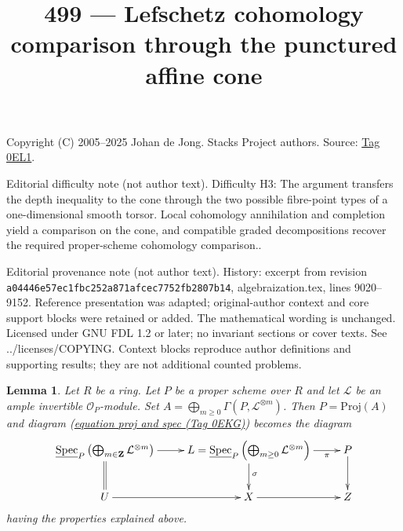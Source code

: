 \documentclass{amsart}
\theoremstyle{plain}
\newtheorem{lemma}[subsection]{Lemma}
\theoremstyle{definition}
\theoremstyle{remark}
\numberwithin{equation}{subsection}
\def\Spec{\mathop{\mathrm{Spec}}}
\begin{document}
\title[Stacks Project, Tag 0EL1]{499 --- Lefschetz cohomology comparison through the punctured affine cone}
\maketitle
\noindent Copyright (C) 2005--2025 Johan de Jong. Stacks Project authors. Source: \href{https://stacks.math.columbia.edu/tag/0EL1}{Tag 0EL1}.

\noindent Editorial difficulty note (not author text). Difficulty H3: The argument transfers the depth inequality to the cone through the two possible fibre-point types of a one-dimensional smooth torsor. Local cohomology annihilation and completion yield a comparison on the cone, and compatible graded decompositions recover the required proper-scheme cohomology comparison..

\noindent Editorial provenance note (not author text). History: excerpt from revision \texttt{a0444\allowbreak 6e57e\allowbreak c1fbc\allowbreak 252a8\allowbreak 71afc\allowbreak ec775\allowbreak 2fb28\allowbreak 07b14}, algebraization.tex, lines 9020--9152. Reference presentation was adapted; original-author context and core support blocks were retained or added. The mathematical wording is unchanged. Licensed under GNU FDL 1.2 or later; no invariant sections or cover texts. See ../licenses/COPYING. Context blocks reproduce author definitions and supporting results; they are not additional counted problems.

\begin{lemma}
\label{more-morphisms-lemma-apply-proj-spec}
Let $R$ be a ring. Let $P$ be a proper scheme over $R$ and let
$\mathcal{L}$ be an ample invertible $\mathcal{O}_P$-module.
Set $A = \bigoplus_{m \geq 0} \Gamma(P, \mathcal{L}^{\otimes m})$.
Then $P = \text{Proj}(A)$ and diagram (\href{https://stacks.math.columbia.edu/tag/0EKG}{equation proj and spec (Tag 0EKG)})
becomes the diagram
$$
\xymatrix{
\underline{\Spec}_P \left(
\bigoplus\nolimits_{m \in \mathbf{Z}} \mathcal{L}^{\otimes m}
\right)
\ar[r] \ar@{=}[d] &
L =
\underline{\Spec}_P \left(
\bigoplus\nolimits_{m \geq 0} \mathcal{L}^{\otimes m}
\right) \ar[d]^\sigma \ar[r]_-\pi & P \ar[d] \\
U \ar[r] & X \ar[r] & Z
}
$$
having the properties explained above.
\end{lemma}
\end{document}
